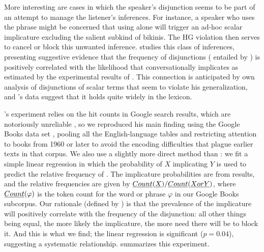 \documentclass[12pt,twoside]{article}
\renewcommand{\_}{\textbf{\textunderscore\hspace{-4pt}\textunderscore\hspace{-3pt}\textunderscore\hspace{-4pt}\textunderscore}\hspace{0.5pt}}			%
\begin{document}
More interesting are cases in which the speaker's disjunction seems to
be part of an attempt to manage the listener's inferences. For
instance, a speaker who uses the phrase 
might be concerned that using  alone will trigger an
ad-hoc scalar implicature \citep{Hirschberg85} excluding the salient
subkind of bikinis. The HG violation then serves to cancel or block
this unwanted inference. \citet{Chemla-HurfordCounts} studies this
class of inferences, presenting suggestive evidence that the frequency
of disjunctions  ( entailed by ) is
positively correlated with the likelihood that 
conversationally implicates  as estimated by the
experimental results of \citet{vanTiel-etal:2013}. This connection is
anticipated by  own analysis of disjunctions
of scalar terms that seem to violate his generalization, and
\citeauthor{Chemla-HurfordCounts}'s data suggest that it holds quite
widely in the lexicon.

\newcommand{\CountGB}{\emph{Count}}

\citeauthor{Chemla-HurfordCounts}'s experiment relies on the hit
counts in Google search results, which are notoriously unreliable
\citep{Liberman:2005}, so we reproduced his main finding using the
Google Books data set \citep{Michel-etal:2011}, pooling all the
English-language tables and restricting attention to books from 1960
or later to avoid the encoding difficulties that plague earlier texts
in that corpus. We also use a slightly more direct method than
\citeauthor{Chemla-HurfordCounts}: we fit a simple linear regression
in which the probability of $X$ implicating $Y$ is used to predict the
relative frequency of . The implicature probabilities are
from  results, and the relative
frequencies are given by
$\CountGB(\word{X\/}) / \CountGB(\word{X or Y\/})$, where
$\CountGB(\varphi)$ is the token count for the word or phrase
$\varphi$ in our Google Books subcorpus. Our rationale (defined by
\citeauthor{Chemla-HurfordCounts}) is that the prevalence of the
implicature will positively correlate with the frequency of the
disjunction: all other things being equal, the more likely the
implicature, the more need there will be to block it. And this is what
we find; the linear regression is significant ($p = 0.04$), suggesting
a systematic relationship.  summarizes this
experiment.
\end{document}
